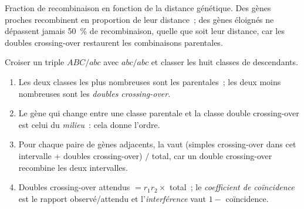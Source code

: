 \begin{omfigure}

{\small Fraction de recombinaison en fonction de la distance génétique.
Des gènes proches recombinent en proportion de leur distance~; des gènes
éloignés ne dépassent jamais \qty{50}{\%} de recombinaison, quelle que
soit leur distance, car les doubles crossing-over restaurent les
combinaisons parentales.}
\end{omfigure}

\begin{method}\label{met:b2:meiosis-heredity:threepoint}
Croiser un triple  $ABC/abc$ avec $abc/abc$ et classer les
huit classes de descendants.
\begin{enumerate}
  \item Les deux classes les plus nombreuses sont les parentales~; les
        deux moins nombreuses sont les \emph{doubles crossing-over}.
  \item Le gène qui change entre une classe parentale et la classe
        double crossing-over est celui du \emph{milieu}~: cela donne
        l'ordre.
  \item Pour chaque paire de gènes adjacents, la  vaut (simples crossing-over dans cet intervalle
        + doubles crossing-over) $/$ total, car un double crossing-over
        recombine les deux intervalles.
  \item Doubles crossing-over attendus $= r_1 r_2 \times$ total~; le
        \emph{coefficient de coïncidence} est le rapport observé/attendu
        et l'\emph{interférence} vaut $1 -$ coïncidence.
\end{enumerate}
\end{method}

